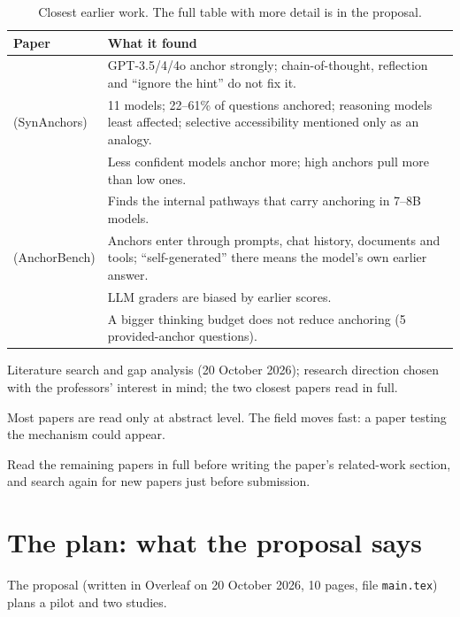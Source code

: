 \documentclass[11pt,a4paper]{article}
\newcommand{\dpn}[3]{%
\begin{tcolorbox}[breakable, colback=white, colframe=trline, boxrule=0.4pt, arc=0pt, left=6pt, right=6pt, top=4pt, bottom=4pt, before skip=10pt, after skip=10pt]
\small
\noindent{\color{donecol}\textsf{\textbf{DONE}}}\quad #1\par\medskip
\noindent{\color{probcol}\textsf{\textbf{PROBLEM}}}\quad #2\par\medskip
\noindent{\color{nextcol}\textsf{\textbf{WHAT WE DID / DO NEXT}}}\quad #3
\end{tcolorbox}}
\begin{document}
\begin{table}[ht]
\centering\small
\begin{tabularx}{\textwidth}{@{}P{3.6cm}L@{}}
\toprule
\textbf{Paper} & \textbf{What it found} \\
\midrule
\citet{lou2026anchoring} & GPT-3.5/4/4o anchor strongly; chain-of-thought, reflection and ``ignore the hint'' do not fix it. \\
\citet{huang2025understanding} (SynAnchors) & 11 models; 22--61\% of questions anchored; reasoning models least affected; selective accessibility mentioned only as an analogy. \\
\citet{owusu2026anchoring} & Less confident models anchor more; high anchors pull more than low ones. \\
\citet{owusu2026localizing} & Finds the internal pathways that carry anchoring in 7--8B models. \\
\citet{borjigin2026anchorbench} (AnchorBench) & Anchors enter through prompts, chat history, documents and tools; ``self-generated'' there means the model's own earlier answer. \\
\citet{kapetanovic2026anchoring} & LLM graders are biased by earlier scores. \\
\citet{kraishan2026long} & A bigger thinking budget does not reduce anchoring (5 provided-anchor questions). \\
\bottomrule
\end{tabularx}
\caption{Closest earlier work. The full table with more detail is in the proposal.}
\label{tab:lit}
\end{table}

\dpn{Literature search and gap analysis (20 October 2026); research direction chosen with the professors' interest in mind; the two closest papers read in full.}
{Most papers are read only at abstract level. The field moves fast: a paper testing the mechanism could appear.}
{Read the remaining papers in full before writing the paper's related-work section, and search again for new papers just before submission.}

\section{The plan: what the proposal says}
\label{sec:proposal}

The proposal (written in Overleaf on 20 October 2026, 10 pages, file \texttt{main.tex}) plans a pilot and two studies.
\end{document}
